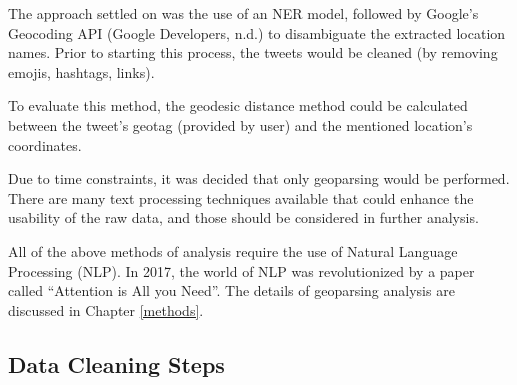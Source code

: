 \begin{description}
    The approach settled on was the use of an NER model, followed by Google’s Geocoding API (Google Developers, n.d.) to disambiguate the extracted location names. Prior to starting this process, the tweets would be cleaned (by removing emojis, hashtags, links).
    
    To evaluate this method, the geodesic distance method could be calculated between the tweet’s geotag (provided by user) and the mentioned location’s coordinates. 
    
\end{description}

Due to time constraints, it was decided that only geoparsing would be performed. There are many text processing techniques available that could enhance the usability of the raw data, and those should be considered in further analysis.

All of the above methods of analysis require the use of Natural Language Processing (NLP). In 2017, the world of NLP was revolutionized by a paper called “Attention is All you Need”. The details of geoparsing analysis are discussed in Chapter \ref{methods}.

\subsection{Data Cleaning Steps}

